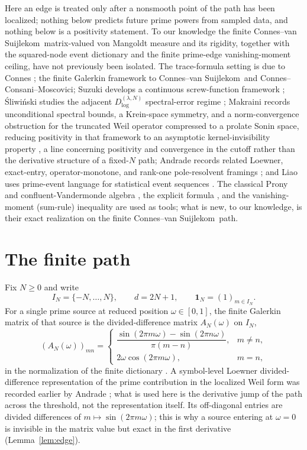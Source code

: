 \documentclass[11pt]{article}
\theoremstyle{plain}
\theoremstyle{definition}
\theoremstyle{remark}
\newcommand{\cvs}{Connes--van Suijlekom}
\newcommand{\ccm}{Connes--Consani--Moscovici}
\newcommand{\one}{\mathbf 1}
\begin{document}
Here an edge is treated only after a nonsmooth point of the path has been
localized; nothing below predicts future prime powers from sampled data, and
nothing below is a positivity statement. To our knowledge the finite \cvs\
matrix-valued von Mangoldt measure and its rigidity, together with the
squared-node event dictionary and the finite prime-edge vanishing-moment
ceiling,
have not previously been isolated. The trace-formula setting is due to Connes
\cite{Connes1999,Connes2026}; the finite Galerkin framework to \cvs\ and \ccm;
Suzuki develops a continuous screw-function framework
\cite{Suzuki2026}; Śliwiński studies the adjacent $D_{\log}^{(\lambda,N)}$
spectral-error regime \cite{Sliwinski2026}; Makraini records unconditional
spectral bounds, a Krein-space symmetry, and a norm-convergence obstruction
for the truncated Weil operator compressed to a prolate Sonin space, reducing
positivity in that framework to an asymptotic kernel-invisibility property
\cite{Makraini2026}, a line concerning positivity and convergence in the
cutoff rather than the derivative structure of a fixed-$N$ path; Andrade records related Loewner,
exact-entry, operator-monotone, and rank-one pole-resolvent framings
\cite{Silva20710075,Silva20737111,Silva20671635,Silva20682834}; and Liao uses prime-event
language for statistical event sequences \cite{Liao2026}. The classical Prony
and confluent-Vandermonde algebra
\cite{Prony1795,Gautschi1962,BatenkovYomdin2013}, the explicit formula
\cite{Weil1952,IwaniecKowalski2004}, and the vanishing-moment (sum-rule)
inequality \cite{Daubechies1992} are used as tools; what is new, to our
knowledge, is their exact
realization on the finite \cvs\ path.

\section{The finite path}\label{sec:path}

Fix $N\ge0$ and write
\[
        I_N=\{-N,\ldots,N\},\qquad d=2N+1,\qquad
        \one_N=(1)_{m\in I_N}.
\]
For a single prime source at reduced position $\omega\in[0,1]$, the finite
Galerkin matrix of that source is the divided-difference matrix $A_N(\omega)$ on
$I_N$,
\[
 (A_N(\omega))_{mn}=
 \begin{cases}
 \dfrac{\sin(2\pi m\omega)-\sin(2\pi n\omega)}{\pi(m-n)},&m\ne n,\\[1.2ex]
 2\omega\cos(2\pi m\omega),&m=n,
 \end{cases}
\]
in the normalization of the finite dictionary \cite{Groskin2026FiniteDictionary}.
A symbol-level Loewner divided-difference representation of the prime
contribution in the localized Weil form was recorded earlier by Andrade
\cite{Silva20710075}; what is used here is the derivative jump of the path
across the threshold, not the representation itself.
Its off-diagonal entries are divided differences of $m\mapsto\sin(2\pi m\omega)$;
this is why a source entering at $\omega=0$ is invisible in the matrix value but
exact in the first derivative (Lemma~\ref{lem:edge}).
\end{document}
